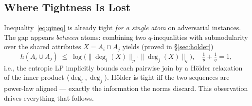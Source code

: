\subsection{Where Tightness Is Lost}

Inequality~\eqref{eq:qineq} is already tight \emph{for a single atom}
on adversarial instances.  The gap appears \emph{between} atoms:
combining two $q$-inequalities with submodularity over the shared
attributes $X = A_i \cap A_j$ yields (proved in \S\ref{sec:holder})
\begin{equation}
h(A_i \cup A_j) \;\le\; \log \big( \|\deg_i(X)\|_p \cdot \|\deg_j(X)\|_q \big),
\quad \tfrac1p+\tfrac1q=1 ,
\label{eq:holderpair}
\end{equation}
i.e., the entropic LP implicitly bounds each pairwise join by a
H\"older relaxation of the inner product
$\langle \deg_i, \deg_j \rangle$.  H\"older is tight iff the two
sequences are power-law aligned --- exactly the information the norms
discard.  This observation drives everything that follows.
